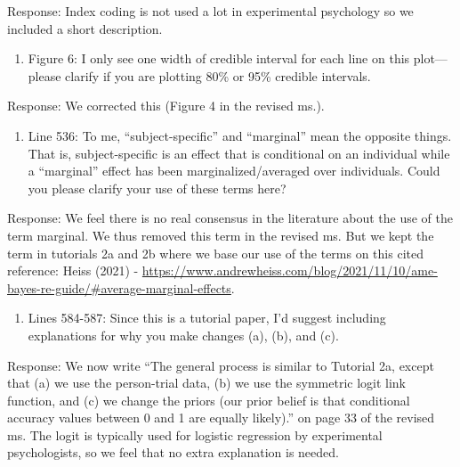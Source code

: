 \documentclass[
]{article}
\providecommand{\tightlist}{%
  \setlength{\itemsep}{0pt}\setlength{\parskip}{0pt}}
\renewenvironment{quote}{\begin{leftbar}}{\end{leftbar}}
\begin{document}
Response: Index coding is not used a lot in experimental psychology so
we included a short description.

\begin{quote}
\begin{enumerate}
\def\labelenumi{\arabic{enumi}.}
\setcounter{enumi}{11}
\tightlist
\item
  Figure 6: I only see one width of credible interval for each line on
  this plot--- please clarify if you are plotting 80\% or 95\% credible
  intervals.
\end{enumerate}
\end{quote}

Response: We corrected this (Figure 4 in the revised ms.).

\begin{quote}
\begin{enumerate}
\def\labelenumi{\arabic{enumi}.}
\setcounter{enumi}{12}
\tightlist
\item
  Line 536: To me, ``subject-specific'' and ``marginal'' mean the
  opposite things. That is, subject-specific is an effect that is
  conditional on an individual while a ``marginal'' effect has been
  marginalized/averaged over individuals. Could you please clarify your
  use of these terms here?
\end{enumerate}
\end{quote}

Response: We feel there is no real consensus in the literature about the
use of the term marginal. We thus removed this term in the revised ms.
But we kept the term in tutorials 2a and 2b where we base our use of the
terms on this cited reference: Heiss (2021) -
\url{https://www.andrewheiss.com/blog/2021/11/10/ame-bayes-re-guide/\#average-marginal-effects}.

\begin{quote}
\begin{enumerate}
\def\labelenumi{\arabic{enumi}.}
\setcounter{enumi}{13}
\tightlist
\item
  Lines 584-587: Since this is a tutorial paper, I'd suggest including
  explanations for why you make changes (a), (b), and (c).
\end{enumerate}
\end{quote}

Response: We now write ``The general process is similar to Tutorial 2a,
except that (a) we use the person-trial data, (b) we use the symmetric
logit link function, and (c) we change the priors (our prior belief is
that conditional accuracy values between 0 and 1 are equally likely).''
on page 33 of the revised ms. The logit is typically used for logistic
regression by experimental psychologists, so we feel that no extra
explanation is needed.
\end{document}
